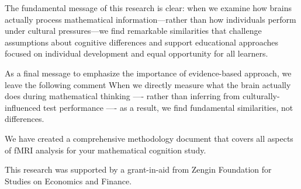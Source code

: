 \documentclass[pdflatex,reference]{sn-jnl}%
\theoremstyle{thmstyleone}%
\theoremstyle{thmstyletwo}%
\theoremstyle{thmstylethree}%
\begin{document}
The fundamental message of this research is clear: when we examine how brains actually process mathematical information—rather than how individuals perform under cultural pressures—we find remarkable similarities that challenge assumptions about cognitive differences and support educational approaches focused on individual development and equal opportunity for all learners.

As a final message to emphasize the importance of evidence-based approach, we leave the following comment  When we directly measure what the brain actually does during mathematical thinking ---- rather than inferring from culturally-influenced test performance ---- as a result, we find fundamental similarities, not differences.

\backmatter


We have created a comprehensive methodology document that covers all aspects of fMRI analysis for your mathematical cognition study.


This research was supported by a grant-in-aid from Zengin Foundation for Studies on Economics and Finance.
\end{document}
